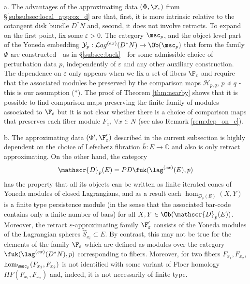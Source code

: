  \begin{rem} \label{rem:compare_data} a. The advantages of the approximating data $(\Phi, \F_{\varepsilon})$ from \S\ref{subsubsec:local_approx_d} are that, first, it is more intrinsic relative to the cotangent disk bundle $D^{\ast}N$ and, second, it does not involve retracts. To expand on the first point, 
 fix some $\varepsilon>0$. The category $\msc_{p}$, and the object level part of the Yoneda embedding $\mathcal{Y}_{p}:\mathcal{L}ag^{(ex)}(D^{\ast}N) \to \Ob(\msc_{p})$ that form the family $\Phi$ are constructed - as in \S\ref{subsec:back} - for some admissible choice of perturbation data  $p$, 
 independently of $\varepsilon$ and any other auxiliary construction. The dependence on $\varepsilon$ only appears when we fix
 a set of fibers $\F_{\varepsilon}$ and require that the associated modules be preserved  by the
 comparison maps $\mathcal{H}_{p,q}$, $p\preceq q$ - this is our assumption ($\ast$). 
 The proof of Theorem \ref{thm:nearby} shows that it is possible
 to find comparison maps preserving the finite family of modules associated to $\F_{\varepsilon}$ but it is 
 not clear whether there is a choice of comparison maps that preserves each fiber module $F_{x}$, $\forall x\in N$  (see also Remark \ref{rem:dep_on_e}).  
 
 b. The approximating data $(\Phi',\F'_{\varepsilon})$  described in the current subsection 
 is highly dependent on the choice of Lefschetz fibration $\bar{h}:E\to \mathbb{C}$ and also is only retract approximating.  On the other hand, the category
 $$\mathscr{D}_{p}(E)= PD \fuk(\lag^{(ex)}(E),p)$$ has the property that all  its objects can be written as finite
 iterated cones of Yoneda modules of closed Lagrangians, and as a result each $\hom_{\mathscr{D}_{p}(E)}(X,Y)$ is a 
 finite type persistence module (in the sense that the associated bar-code contains only a finite number of bars) for all $X,Y\in \Ob(\mathscr{D}_{p}(E))$. Moreover, the retract $\varepsilon$-approximating family $\F'_{\varepsilon}$ consists of the Yoneda modules of the Lagrangian spheres $ \hat{S}_{x_{i}}\subset E$.  
 By contrast, this may not be true for the elements of the family $\F_{\varepsilon}$ which are defined as modules over  the category  $\fuk (\lag^{(ex)}(D^{\ast}N),p)$ corresponding to fibers. Moreover, for two fibers $F_{x_{1}}, F_{x_{2}}$,  $\hom_{\msc_{p}}(F_{x_{1}}, F_{x_{2}})$ is not identified with some variant of Floer
 homology $HF(F_{x_{1}}, F_{x_{2}})$ and, indeed, it is not necessarily of finite type.  \end{rem}
 
 
 
 
 
 
 
 
 
 
 
 
 
 
 
  
 
 
 
 
 
 
 